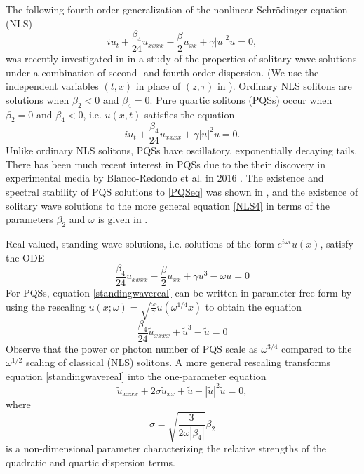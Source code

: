 \documentclass[12pt]{article}
\begin{document}
The following fourth-order generalization of the nonlinear Schr{\"o}dinger equation (NLS)
\begin{equation}\label{NLS4}
i u_t + \frac{\beta_4}{24}u_{xxxx} - \frac{\beta}{2}u_{xx} + \gamma |u|^2 u = 0,
\end{equation}
was recently investigated in \cite{Tam2020} in a study of the properties of solitary wave solutions under a combination of second- and fourth-order dispersion. (We use the independent variables $(t, x)$ in place of $(z, \tau)$ in \cite{Tam2020}). Ordinary NLS solitons are solutions when $\beta_2 < 0$ and $\beta_4 = 0$. Pure quartic solitons (PQSs) occur when $\beta_2 = 0$ and $\beta_4 < 0$, i.e. $u(x,t)$ satisfies the equation
\begin{equation}\label{PQSeq}
i u_t + \frac{\beta_4}{24}u_{xxxx} + \gamma |u|^2 u = 0.
\end{equation}
Unlike ordinary NLS solitons, PQSs have oscillatory, exponentially decaying tails. There has been much recent interest in PQSs due to the their discovery in experimental media by Blanco-Redondo et al. in 2016 \cite{BlancoPQS}. The existence and spectral stability of PQS solutions to \cref{PQSeq} was shown in \cite{Tam2019}, and the existence of solitary wave solutions to the more general equation \cref{NLS4} in terms of the parameters $\beta_2$ and $\omega$ is given in \cite{Tam2020}.

Real-valued, standing wave solutions, i.e. solutions of the form $e^{i \omega t} u(x)$, satisfy the ODE 
\begin{equation}\label{standingwavereal}
\frac{\beta_4}{24}u_{xxxx} - \frac{\beta}{2}u_{xx} + \gamma u^3 - \omega u = 0
\end{equation}
For PQSs, equation \cref{standingwavereal} can be written in parameter-free form by using the rescaling $u(x; \omega) = \sqrt{\frac{\omega}{\gamma}}\tilde{u}(\omega^{1/4}x)$ to obtain the equation
\begin{equation}\label{PQSparfree}
\frac{\beta_4}{24}\tilde{u}_{xxxx} + \tilde{u}^3 - \tilde{u} = 0
\end{equation}
Observe that the power or photon number of PQS scale as $\omega^{3/4}$ compared to the $\omega^{1/2}$ scaling of classical (NLS) solitons. A more general rescaling \cite[Section VI]{Tam2020} transforms equation \cref{standingwavereal} into the one-parameter equation
\begin{equation}\label{NLS4onepar}
\tilde{u}_{xxxx} + 2 \sigma \tilde{u}_{xx} +  \tilde{u} - |\tilde{u}|^2 \tilde{u} = 0,
\end{equation}
where 
\[
\sigma = \sqrt{\frac{3}{2 \omega |\beta_4| }}\beta_2
\]
is a non-dimensional parameter characterizing the relative strengths of the quadratic and quartic dispersion terms.
\end{document}
